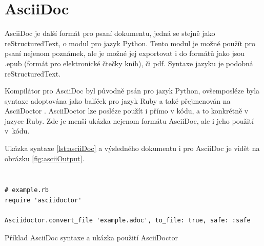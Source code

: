 \clearpage

\section{AsciiDoc}

AsciiDoc je další formát pro psaní dokumentu, jedná se stejně jako reStructuredText, o modul pro jazyk Python. Tento modul je možné použít pro psaní nejenom poznámek,
ale je možné jej exportovat i do formátů jako jsou .epub (formát pro elektronické čtečky knih), či \gls{pdf}. \cite{asciiDoc} Syntaxe jazyku je podobná reStructuredText.

Kompilátor pro AsciiDoc byl původně psán pro jazyk Python, ovšem\linebreak posléze byla syntaxe adoptována jako balíček pro jazyk Ruby a také přejme\-nován na AsciiDoctor \cite{asciiDoctorSW}. AsciiDoctor lze posléze
použít i přímo v kódu, a to konkrétně v jazyce Ruby. Zde je menší ukázka nejenom formátu AsciiDoc, ale i jeho použití v~kódu.

Ukázka syntaxe \ref{lst:asciiDoc} a výsledného dokumentu i pro AsciiDoc je vidět na obrázku \ref{fig:asciiOutput}.

\begin{listing}[ht]
    \inputminted[linenos,breaklines]{text}{example-ascii.adoc}
    \inputminted[linenos,breaklines]{text}{module.adoc}
    \begin{verbatim}
# example.rb
require 'asciidoctor'

Asciidoctor.convert_file 'example.adoc', to_file: true, safe: :safe
    \end{verbatim}
    \caption{Příklad AsciiDoc syntaxe a ukázka použití AsciiDoctor}
    \label{lst:asciiDoc}
\end{listing}

